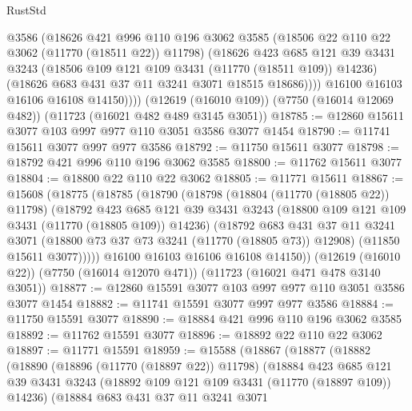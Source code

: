 \begin{lexlean}{RustStd}
\begin{coremodule}
              @3586
              (@18626
                @421
                @996
                @110
                @196
                @3062
                @3585
                (@18506 @22 @110 @22 @3062 (@11770 (@18511 @22)) @11798)
                (@18626
                  @423
                  @685
                  @121
                  @39
                  @3431
                  @3243
                  (@18506 @109 @121 @109 @3431 (@11770 (@18511 @109)) @14236)
                  (@18626 @683 @431 @37 @11 @3241 @3071 @18515 @18686))))
            @16100
            @16103
            @16106
            @16108
            @14150))))
    (@12619 (@16010 @109))
    (@7750 (@16014 @12069 @482))
    (@11723 (@16021 @482 @489 @3145 @3051))
@18785 := @12860 @15611 @3077 @103 @997 @977 @110 @3051 @3586 @3077 @1454
@18790 := @11741 @15611 @3077 @997 @977 @3586
@18792 := @11750 @15611 @3077
@18798 := @18792 @421 @996 @110 @196 @3062 @3585
@18800 := @11762 @15611 @3077
@18804 := @18800 @22 @110 @22 @3062
@18805 := @11771 @15611
@18867 := @15608
    (@18775
      (@18785
        (@18790
          (@18798
            (@18804 (@11770 (@18805 @22)) @11798)
            (@18792
              @423
              @685
              @121
              @39
              @3431
              @3243
              (@18800 @109 @121 @109 @3431 (@11770 (@18805 @109)) @14236)
              (@18792
                @683
                @431
                @37
                @11
                @3241
                @3071
                (@18800 @73 @37 @73 @3241 (@11770 (@18805 @73)) @12908)
                (@11850 @15611 @3077)))))
        @16100
        @16103
        @16106
        @16108
        @14150))
    (@12619 (@16010 @22))
    (@7750 (@16014 @12070 @471))
    (@11723 (@16021 @471 @478 @3140 @3051))
@18877 := @12860 @15591 @3077 @103 @997 @977 @110 @3051 @3586 @3077 @1454
@18882 := @11741 @15591 @3077 @997 @977 @3586
@18884 := @11750 @15591 @3077
@18890 := @18884 @421 @996 @110 @196 @3062 @3585
@18892 := @11762 @15591 @3077
@18896 := @18892 @22 @110 @22 @3062
@18897 := @11771 @15591
@18959 := @15588
    (@18867
      (@18877
        (@18882
          (@18890
            (@18896 (@11770 (@18897 @22)) @11798)
            (@18884
              @423
              @685
              @121
              @39
              @3431
              @3243
              (@18892 @109 @121 @109 @3431 (@11770 (@18897 @109)) @14236)
              (@18884
                @683
                @431
                @37
                @11
                @3241
                @3071

\end{coremodule}
\end{lexlean}
